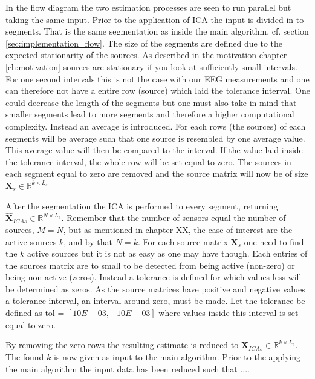 In the flow diagram the two estimation processes are seen to run parallel but taking the same input. 
Prior to the application of ICA the input is divided in to segments. That is the same segmentation as inside the main algorithm, cf. section \ref{sec:implementation_flow}.
The size of the segments are defined due to the expected stationarity of the sources. As described in the motivation chapter \ref{ch:motivation} sources are stationary if you look at sufficiently small intervals. 
For one second intervals this is not the case with our EEG measurements and one can therefore not have a entire row (source) which laid the tolerance interval. One could decrease the length of the segments but one must also take in mind that smaller segments lead to more segments and therefore a higher computational complexity. Instead an average is introduced. For each rows (the sources) of each segments will be average such that one source is resembled by one average value. This average value will then be compared to the interval. If the value laid inside the tolerance interval, the whole row will be set equal to zero. The sources in each segment equal to zero are removed and the source matrix will now be of size $\mathbf{X}_s \in \mathbb{R}^{k \times L_s}$

After the segmentation the ICA is performed to every segment, returning $\hat{\textbf{X}}_{ICA s} \in \mathbb{R}^{N \times L_s}$.
Remember that the number of sensors equal the number of sources, $M = N$, but as mentioned in chapter XX, the case of interest are the active sources $k$, and by that $N = k$. 
For each source matrix $\mathbf{X}_s$ one need to find the $k$ active sources but it is not as easy as one may have though. Each entries of the sources matrix are to small to be detected from being active (non-zero) or being non-active (zeros).
Instead a tolerance is defined for which values less will be determined as zeros. As the source matrices have positive and negative values a tolerance interval, an interval around zero, must be made. Let the tolerance be defined as tol = $[10E-03, -10E-03]$ where values inside this interval is set equal to zero.

By removing the zero rows the resulting estimate is reduced to $\hat{\textbf{X}}_{ICA s} \in \mathbb{R}^{k \times L_s}$. The found $k$ is now given as input to the main algorithm. Prior to the applying the main algorithm the input data has been reduced  such that ....    
 

